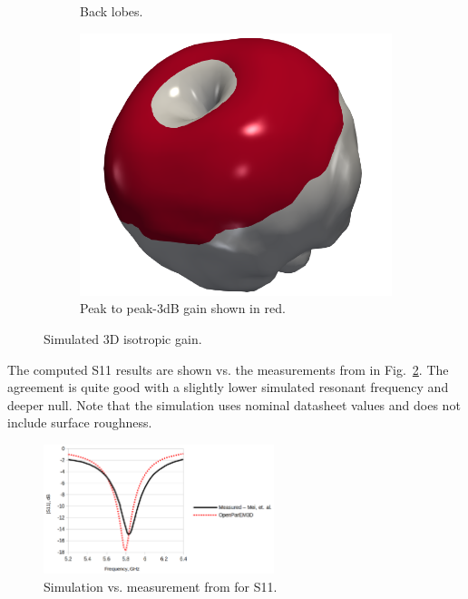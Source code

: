 \documentclass[titlepage]{article}
\renewcommand\_{\textunderscore\linebreak[1]}
\begin{document}
\begin{figure}[H]
\begin{subfigure}[t]{0.3\textwidth}
     \caption{Back lobes.}
  \end{subfigure}
  \begin{subfigure}[t]{0.3\textwidth}
     \includegraphics[width=1\linewidth]{../regression/OpenParEM3D/antenna/patch_study/screenshots/patch_3D_3dB}
     \caption{Peak to peak-3dB gain shown in red.}
  \end{subfigure}
  \caption{Simulated 3D isotropic gain.}
  \label{fig:patch_3D_gain}
\end{figure}

The computed S11 results are shown vs. the measurements from \cite{Mei} in Fig.~\ref{fig:patch_S11}.  The agreement is quite good with a slightly lower simulated resonant frequency and deeper null.  Note that the simulation uses nominal datasheet values and does not include surface roughness.

\begin{figure}[H]
  \centering
  \includegraphics[width=0.6\textwidth]{../regression/OpenParEM3D/antenna/patch_study/screenshots/patch_S11}
  \caption{Simulation vs. measurement from \cite{Mei} for S11.}
  \label{fig:patch_S11}
\end{figure}
\end{document}
